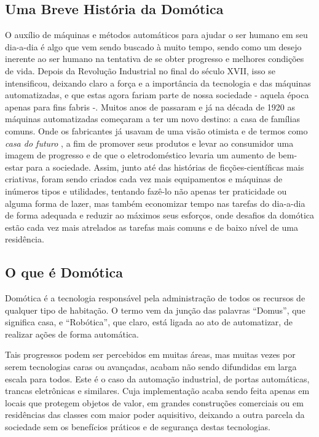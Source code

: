 \documentclass[draft]{article}
\begin{document}
\subsection{Uma Breve História da Domótica}
O auxílio de máquinas e métodos automáticos para ajudar o ser humano em seu dia-a-dia é algo que vem sendo buscado à muito tempo, sendo como um desejo inerente ao ser humano na tentativa de se obter progresso e melhores condições de vida. Depois da Revolução Industrial no final do século XVII, isso se intensificou, deixando claro a força e a importância da tecnologia e das máquinas automatizadas, e que estas agora fariam parte de nossa sociedade - aquela época apenas para fins fabris \cite{hobsbawm1} -. Muitos anos de passaram e já na década de 1920 as máquinas automatizadas começaram a ter um novo destino: a casa de famílias comuns. Onde os fabricantes já usavam de uma visão otimista e de termos como \textit{casa do futuro} \cite{bolzani}, a fim de promover seus produtos e levar ao consumidor uma imagem de progresso e de que o eletrodoméstico levaria um aumento de bem-estar para a sociedade. Assim, junto até das histórias de ficções-científicas mais criativas, foram sendo criados cada vez mais equipamentos e máquinas de inúmeros tipos e utilidades, tentando fazê-lo não apenas ter praticidade ou alguma forma de lazer, mas também economizar tempo nas tarefas do dia-a-dia de forma adequada e reduzir ao máximos seus esforços, onde desafios da domótica estão cada vez mais atrelados as tarefas mais comuns e de baixo nível de uma residência.

\subsection{O que é Domótica}
Domótica é a tecnologia responsável pela administração de todos os recursos de qualquer tipo de habitação. O termo vem da junção das palavras “Domus”, que significa casa, e “Robótica”, que claro, está ligada ao ato de automatizar, de realizar ações de forma automática. \cite{chamusca}


Tais progressos podem ser percebidos em muitas áreas, mas muitas vezes por serem tecnologias caras ou avançadas, acabam não sendo difundidas em larga escala para todos. Este é o caso da automação industrial, de portas automáticas, trancas eletrônicas e similares. Cuja implementação acaba sendo feita apenas em locais que protegem objetos de valor, em grandes construções comerciais ou em residências das classes com maior poder aquisitivo, deixando a outra parcela da sociedade sem os benefícios práticos e de segurança destas tecnologias.
\end{document}
